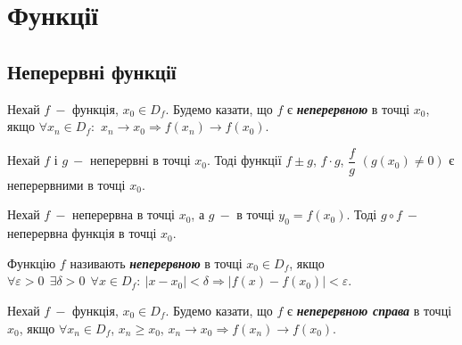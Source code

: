 
\section{\Large{Функції}}

\subsection{\large{Неперервні функції}}

\begin{definition}[за Гейне]
         Нехай $f \: -$ функція, $x_0 \in D_f$. Будемо казати, що $f$ є \textcolor{NavyBlue}{\textbf{\textit{{неперервною}}}} в точці $x_0$, якщо  $\forall x_n \in D_f:$ $x_n \to x_0 \Rightarrow  f(x_n) \to f(x_0).$
\end{definition}

\begin{theorem}
       Нехай $f$ і $g \: -$ неперервні в точці $x_0$. \newline Тоді функції $f \pm g$, $f \cdot g$, $\dfrac{f}{g}$ $(g(x_0) \neq 0)$ є неперервними в точці $x_0.$ 
\end{theorem}

\begin{theorem}
       Нехай $f \:-$ неперервна в точці $x_0$, \newline а $g \: - $ в точці $y_0 = f(x_0).$ Тоді $g \circ f \:-$ неперервна функція в точці $x_0$.
\end{theorem}

\begin{definition}[за Коші]
      Функцію $f$ називають \textcolor{NavyBlue}{\textbf{\textit{{неперервною}}}} в точці $x_0 \in D_f$,  якщо \newline  $\forall \varepsilon > 0  \ \ \exists \delta > 0 \  \ \forall x \in D_f: \ |x - x_0| < \delta \Rightarrow |f(x) - f(x_0)| < \varepsilon.$          
\end{definition}
      
\begin{definition}[за Гейне]
      Нехай $f \: -$ функція, $x_0 \in D_f$. Будемо казати, що $f$ є \textcolor{NavyBlue}{\textbf{\textit{{неперервною справа}}}} в точці $x_0$, якщо  $\forall x_n \in D_f$, $x_n \geqslant  x_0$,  $x_n \to x_0 \Rightarrow  f(x_n) \to f(x_0).$      
\end{definition}
      
